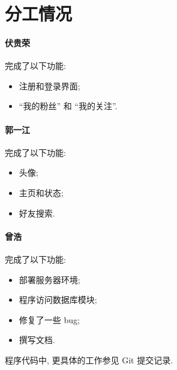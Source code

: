 \documentclass[a4paper,10pt]{article}
\begin{document}
\section{分工情况}

\paragraph{伏贵荣}
完成了以下功能:
\begin{itemize}
	\item 注册和登录界面;
	\item ``我的粉丝'' 和 ``我的关注''.
\end{itemize}

\paragraph{郭一江}
完成了以下功能:
\begin{itemize}
	\item 头像;
	\item 主页和状态;
	\item 好友搜索.
\end{itemize}

\paragraph{曾浩}
完成了以下功能:
\begin{itemize}
	\item 部署服务器环境;
	\item 程序访问数据库模块;
	\item 修复了一些 bug;
	\item 撰写文档.
\end{itemize}

程序代码中, 更具体的工作参见 Git 提交记录.
\end{document}
